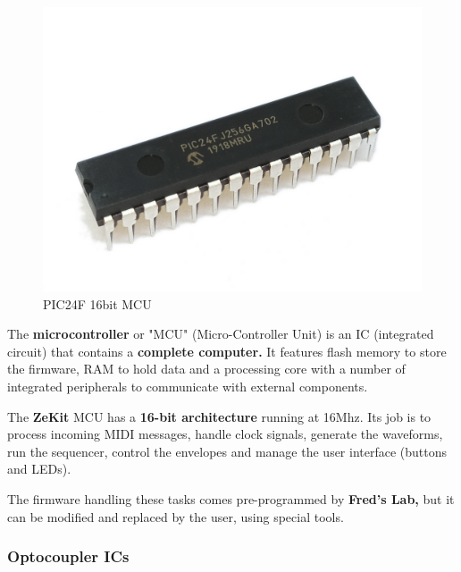 \documentclass{scrartcl}
\begin{document}
\begin{figure}[!ht]
    \begin{center}
        \includegraphics[scale=0.10]{assets/zekit-mcu.jpg}
        \caption{PIC24F 16bit MCU}
    \end{center}
\end{figure}

The \textbf{microcontroller} or "MCU" (Micro-Controller Unit) is an IC (integrated circuit) that contains a \textbf{complete computer.} It features flash memory to store the firmware, RAM to hold data and a processing core with a number of integrated peripherals to communicate with external components.

The \textbf{ZeKit} MCU has a \textbf{16-bit architecture} running at 16Mhz. Its job is to process incoming MIDI messages, handle clock signals, generate the waveforms, run the sequencer, control the envelopes and manage the user interface (buttons and LEDs).

The firmware handling these tasks comes pre-programmed by \textbf{Fred’s Lab,} but it can be modified and replaced by the user, using special tools.

\subsubsection{Optocoupler ICs}
\end{document}
